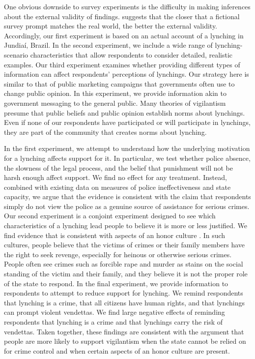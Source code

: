 \documentclass[12pt,a4paper]{article}
\begin{document}
One obvious downside to survey experiments is the difficulty in making
inferences about the external validity of findings.
\citet[17-18]{bateson2020politics} suggests that the closer that a fictional
survey prompt matches the real world, the better the external validity.
Accordingly, our first experiment is based on an actual account of a lynching
in Jundia\'{i}, Brazil. In the second experiment, we include a wide range of
lynching-scenario characteristics that allow respondents to consider detailed,
realistic examples. Our third experiment examines whether providing different
types of information can affect respondents' perceptions of lynchings. Our
strategy here is similar to that of public marketing campaigns that governments
often use to change public opinion. In this experiment, we provide information
akin to government messaging to the general public. Many theories of
vigilantism presume that public beliefs and public opinion establish norms
about lynchings. Even if none of our respondents have participated or will
participate in lynchings, they are part of the community that creates norms
about lynching.

In the first experiment, we attempt to understand how the underlying motivation for a lynching affects support for it. In particular, we test whether police absence, the slowness of the legal process, and the belief that punishment will not be harsh enough affect support. We find no effect for any treatment. Instead, combined with existing data on measures of police ineffectiveness and state capacity, we argue that the evidence is consistent with the claim that respondents simply do not view the police as a genuine source of assistance for serious crimes. Our second experiment is a conjoint experiment designed to see which characteristics of a lynching lead people to believe it is more or less justified. We find evidence that is consistent with aspects of an honor culture  \citep{nisbett2018culture,grosjean2014history}. In such cultures, people believe that the victims of crimes or their family members have the right to seek revenge, especially for heinous or otherwise serious crimes. People often see crimes such as forcible rape and murder as stains on the social standing of the victim and their family, and they believe it is not the proper role of the state to respond. In the final experiment, we provide information to respondents to attempt to reduce support for lynching. We remind respondents that lynching is a crime, that all citizens have human rights, and that lynchings can prompt violent vendettas. We find large negative effects of reminding respondents that lynching is a crime and that lynchings carry the risk of vendettas. Taken together, these findings are consistent with the argument that people are more likely to support vigilantism when the state cannot be relied on for crime control and when certain aspects of an honor culture are present.
\end{document}
